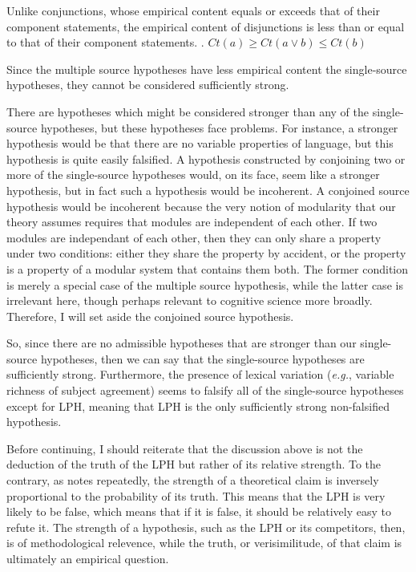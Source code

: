 \documentclass[MilwayThesis]{subfiles}
\begin{document}
Unlike conjunctions, whose empirical content equals or exceeds that of their component statements, the empirical content of disjunctions is less than or equal to that of their component statements.
\ex. $Ct(a) \geq Ct(a\vee b) \leq Ct(b)$

Since the multiple source hypotheses have less empirical content the single-source hypotheses, they cannot be considered sufficiently strong.

There are hypotheses which might be considered stronger than any of the single-source hypotheses, but these hypotheses face problems.
For instance, a stronger hypothesis would be that there are no variable properties of language, but this hypothesis is quite easily falsified.
A hypothesis constructed by conjoining two or more of the single-source hypotheses would, on its face, seem like a stronger hypothesis, but in fact such a hypothesis would be incoherent.
A conjoined source hypothesis would be incoherent because the very notion of modularity that our theory assumes requires that modules are independent of each other.
If two modules are independant of each other, then they can only share a property under two conditions: either they share the property by accident, or the property is a property of a modular system that contains them both.
The former condition is merely a special case of the multiple source hypothesis, while the latter case is irrelevant here, though perhaps relevant to cognitive science more broadly.
Therefore, I will set aside the conjoined source hypothesis.

So, since there are no admissible hypotheses that are stronger than our single-source hypotheses, then we can say that the single-source hypotheses are sufficiently strong.
Furthermore, the presence of lexical variation (\textit{e.g.}, variable richness of subject agreement) seems to falsify all of the single-source hypotheses except for LPH, meaning that LPH is the only sufficiently strong non-falsified hypothesis.

Before continuing, I should reiterate that the discussion above is not the deduction of the truth of the LPH but rather of its relative strength.
To the contrary, as \textcite{popper2014conjectures} notes repeatedly, the strength of a theoretical claim is inversely proportional to the probability of its truth.
This means that the LPH is very likely to be false, which means that if it is false, it should be relatively easy to refute it.
The strength of a hypothesis, such as the LPH or its competitors, then, is of methodological relevence, while the truth, or verisimilitude, of that claim is ultimately an empirical question.
\end{document}
